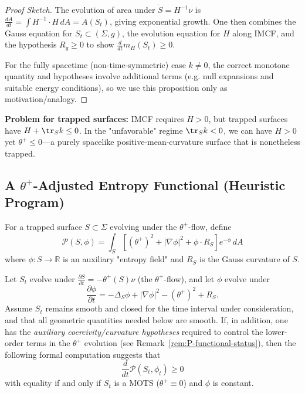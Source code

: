 \begin{proof}[Proof Sketch]
The evolution of area under $\dot{S} = H^{-1}\nu$ is $\frac{dA}{dt} = \int H^{-1} \cdot H \, dA = A(S_t)$, giving exponential growth. One then combines the Gauss equation for $S_t\subset (\Sigma,g)$, the evolution equation for $H$ along IMCF, and the hypothesis $R_g\ge 0$ to show $\frac{d}{dt}m_H(S_t)\ge 0$.

For the fully spacetime (non-time-symmetric) case $k\ne 0$, the correct monotone quantity and hypotheses involve additional terms (e.g. null expansions and suitable energy conditions), so we use this proposition only as motivation/analogy.
\end{proof}

\textbf{Problem for trapped surfaces:} IMCF requires $H > 0$, but trapped surfaces have $H + \tr_S k \leq 0$. In the "unfavorable" regime $\tr_S k < 0$, we can have $H > 0$ yet $\theta^+ \leq 0$---a purely spacelike positive-mean-curvature surface that is nonetheless trapped.

\subsection{A \texorpdfstring{$\theta^+$}{theta+}-Adjusted Entropy Functional (Heuristic Program)}

\begin{definition}
\label{def:spacetime-perelman}
For a trapped surface $S \subset \Sigma$ evolving under the $\theta^+$-flow, define
\begin{equation}
\mathcal{P}(S, \phi) = \int_S \left[(\theta^+)^2 + |\nabla\phi|^2 + \phi \cdot R_S\right]e^{-\phi} \, dA
\label{eq:penrose-entropy}
\end{equation}
where $\phi: S \to \mathbb{R}$ is an auxiliary "entropy field" and $R_S$ is the Gauss curvature of $S$.
\end{definition}

\begin{theorem}
\label{thm:spacetime-monotonicity}
Let $S_t$ evolve under $\frac{\partial S}{\partial t} = -\theta^+(S)\nu$ (the $\theta^+$-flow), and let $\phi$ evolve under
\begin{equation}
\frac{\partial \phi}{\partial t} = -\Delta_S \phi + |\nabla \phi|^2 - (\theta^+)^2 + R_S.
\label{eq:phi-evolution}
\end{equation}
Assume $S_t$ remains smooth and closed for the time interval under consideration, and that all geometric quantities needed below are smooth.
If, in addition, one has the \emph{auxiliary coercivity/curvature hypotheses} required to control the lower-order terms in the $\theta^+$ evolution (see Remark~\ref{rem:P-functional-status}), then the following formal computation suggests that
\begin{equation}
\frac{d}{dt}\mathcal{P}(S_t, \phi_t) \geq 0
\label{eq:P-monotone}
\end{equation}
with equality if and only if $S_t$ is a MOTS ($\theta^+ \equiv 0$) and $\phi$ is constant.
\end{theorem}

